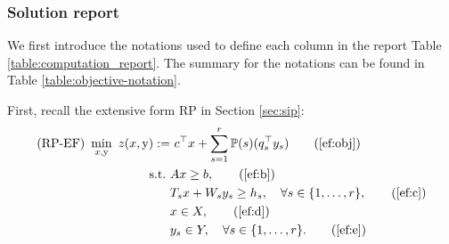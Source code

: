 
\subsubsection{Solution report} \label{subsec:sol_report}
We first introduce the notations used to define each column in the report Table \ref{table:computation_report}. The summary for the notations can be found in Table \ref{table:objective-notation}.

First, recall the extensive form RP in Section \ref{sec:sip}:
\begin{subequations}\label{ef}
	\begin{align}
	\textrm{(RP-EF) }\min_{x,\mathrm{y}}\ z(x,\mathrm{y}):=&\ c^{\top}x + \sum_{s=1}^{r}\PP(s) (q_s^{\top}y_s) \tag{\ref{ef:obj}}\\ 
	\mathrm{s.t.}\ &Ax\ge b,  \tag{\ref{ef:b}}\\
	&T_s x+W_s y_s\ge h_s,\quad\forall s\in\{1,\ldots,r\}, \tag{\ref{ef:c}} \\
	&x\in X, \tag{\ref{ef:d}} \\
	&y_s \in Y,\quad\forall s\in\{1,\ldots,r\}. \tag{\ref{ef:e}}
	\end{align}
\end{subequations}

